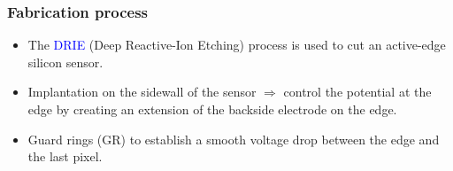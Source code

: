 \begin{frame}
  \frametitle{Fabrication process}

  \begin{itemize}
  \item The \textcolor{Blue}{DRIE} (Deep Reactive-Ion Etching) process
    is used to cut an active-edge silicon sensor.
  \item Implantation on the sidewall of the sensor $\Rightarrow$
    control the potential at the edge by creating an extension of the
    backside electrode on the edge.
  \item Guard rings (GR) to establish a smooth voltage drop between
    the edge and the last pixel.
  \end{itemize}

  \begin{columns}

\end{columns}
\end{frame}
